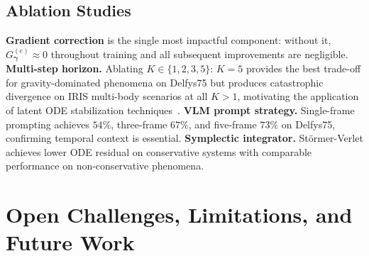 \documentclass[runningheads]{llncs}
\begin{document}
\subsection{Ablation Studies}
\label{sec:ablations}
\noindent
\textbf{Gradient correction} is the single most impactful component: without it, $G_{\boldsymbol{\gamma}}^{(e)} \approx 0$ throughout training and all subsequent improvements are negligible.
\textbf{Multi-step horizon.} Ablating $K \in \{1, 2, 3, 5\}$: $K{=}5$ provides the best trade-off for gravity-dominated phenomena on Delfys75 but produces catastrophic divergence on IRIS multi-body scenarios at all $K > 1$, motivating the application of latent ODE stabilization techniques~\cite{finlay2020trainneuralodeworld}.
\textbf{VLM prompt strategy.} Single-frame prompting achieves $54\%$, three-frame $67\%$, and five-frame $73\%$ on Delfys75, confirming temporal context is essential.
\textbf{Symplectic integrator.} St\"ormer-Verlet achieves lower ODE residual on conservative systems with comparable performance on non-conservative phenomena.


\section{Open Challenges, Limitations, and Future Work}
\label{sec:challenges}
\end{document}
